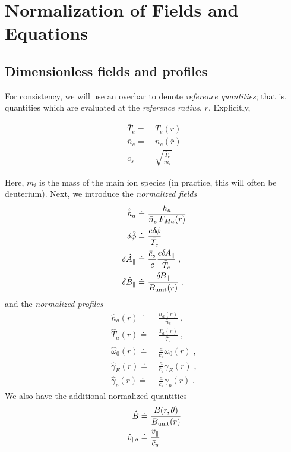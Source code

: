 \chapter{Normalization of Fields and Equations}

\section{Dimensionless fields and profiles}

For consistency, we will use an overbar to denote {\it 
reference quantities}; that is, quantities which are 
evaluated at the {\it reference radius}, $\bar{r}$.
Explicitly, 

\begin{align}
\bar{T}_e = &~T_e(\bar{r}) \\
\bar{n}_e = &~n_e(\bar{r}) \\
\bar{c}_s = &~\sqrt{\frac{\bar{T}_e}{m_i}}
\end{align}

\noindent
Here, $m_i$ is the mass of the main ion species (in practice, 
this will often be deuterium).  Next, we introduce the 
{\it normalized fields}
%
\begin{align}
\hat{h}_a     \doteq &~\frac{h_a}{\bar{n}_e \, F_{M a}(r)} \\
\delta \hat{\phi} \doteq &~\frac{e \delta \hskip -1pt \phi}{\bar{T}_e} \\
\delta \hat{A}_\parallel \doteq &~ 
  \frac{\bar{c}_s}{c} \frac{e \delta \hskip -1pt A_\parallel}{\bar{T}_e} \; , \\
\delta \hat{B}_\parallel \doteq &~ 
   \frac{\delta \hskip -1pt B_\parallel}{B_{\rm unit}(r)} \; ,
\end{align}
%
and the {\it normalized profiles}
%
\begin{align}
\hat{n}_a(r) \doteq &~\frac{n_a(r)}{\bar{n}_e} \; , \\
\hat{T}_a(r) \doteq &~\frac{T_a(r)}{\bar{T}_e} \; , \\
\hat{\omega}_0(r) \doteq &~\frac{a}{\bar{c}_s} \omega_0(r) \; , \\
\hat{\gamma}_E(r) \doteq &~\frac{a}{\bar{c}_s} \gamma_E(r) \; , \\
\hat{\gamma}_p(r) \doteq &~\frac{a}{\bar{c}_s} \gamma_p(r) \; .
\end{align}
%
We also have the additional normalized quantities
%
\begin{align}
\hat{B}       \doteq &~\frac{B(r,\theta)}{B_{\rm unit}(r)} \\
\hat{v}_{\parallel a}      \doteq &~\frac{v_\parallel}{\bar{c}_s} 
\end{align}

